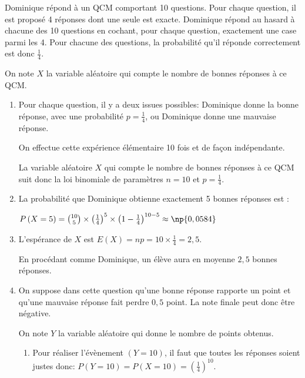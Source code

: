 
Dominique répond à un QCM comportant 10 questions.
Pour chaque question, il est proposé 4 réponses dont une seule est exacte.
Dominique répond au hasard à chacune des 10 questions en cochant, pour chaque question, exactement une case parmi les 4.
Pour chacune des questions, la probabilité qu'il réponde correctement est donc $\frac{1}{4}$.

On note $X$ la variable aléatoire qui compte le nombre de bonnes réponses à ce QCM.

\begin{enumerate}
\item %
Pour chaque question, il y a deux issues possibles: Dominique donne la bonne réponse, avec une probabilité $p=\frac{1}{4}$, ou Dominique donne une mauvaise réponse.

On effectue cette expérience élémentaire 10 fois et de façon indépendante.

La variable aléatoire $X$ qui compte le nombre de bonnes réponses à ce QCM suit donc la loi binomiale de paramètres $n=10$ et $p=\frac{1}{4}$.

\item %
La probabilité que Dominique obtienne exactement 5 bonnes réponses est :

$P\left (X=5\right ) = \binom{10}{5} \times \left (\frac{1}{4}\right )^5 \times \left (1-\frac{1}{4}\right )^{10-5}\approx \np{0,0584}$

\item %
L'espérance de $X$ est $E(X)=np = 10\times \frac{1}{4}= 2,5$.

En procédant comme Dominique, un élève aura en moyenne $2,5$ bonnes réponses.

\item On suppose dans cette question qu'une bonne réponse rapporte un point et qu'une mauvaise réponse fait perdre $0,5$ point. La note finale peut donc être négative.

On note $Y$ la variable aléatoire qui donne le nombre de points obtenus.

	\begin{enumerate}
		\item %
Pour réaliser l'évènement $(Y=10)$, il faut que toutes les réponses soient justes donc:
$P\left (Y = 10\right )=P\left (X = 10\right ) = \left (\frac{1}{4}\right )^{10}$.		
				

\end{enumerate}
\end{enumerate}
